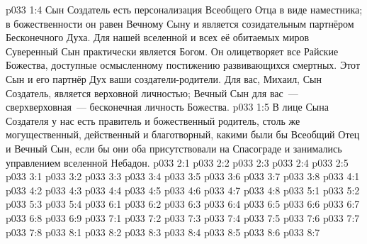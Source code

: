 \vs p033 1:4 Сын Создатель есть персонализация Всеобщего Отца в виде наместника; в божественности он равен Вечному Сыну и является созидательным партнёром Бесконечного Духа. Для нашей вселенной и всех её обитаемых миров Суверенный Сын практически является Богом. Он олицетворяет все Райские Божества, доступные осмысленному постижению развивающихся смертных. Этот Сын и его партнёр Дух  ваши создатели\hyp{}родители. Для вас, Михаил, Сын Создатель, является верховной личностью; Вечный Сын для вас~--- сверхверховная~--- бесконечная личность Божества.
\vs p033 1:5 \pc В лице Сына Создателя у нас есть правитель и божественный родитель, столь же могущественный, действенный и благотворный, какими были бы Всеобщий Отец и Вечный Сын, если бы они оба присутствовали на Спасограде и занимались управлением вселенной Небадон.
\vs p033 2:1 
\vs p033 2:2 
\vs p033 2:3 \pc 
\vs p033 2:4 
\vs p033 2:5 \pc 
{}
\vs p033 3:1 
\vs p033 3:2 \pc 
\vs p033 3:3 \pc 
\vs p033 3:4 \pc 
\vs p033 3:5 
\vs p033 3:6 
\vs p033 3:7 
\vs p033 3:8 \pc 
{}
\vs p033 4:1 
\vs p033 4:2 
\vs p033 4:3 
\vs p033 4:4 \pc 
\vs p033 4:5 
\vs p033 4:6 
\vs p033 4:7 \pc 
\vs p033 4:8 
\vs p033 5:1 
\vs p033 5:2 
\vs p033 5:3 
\vs p033 5:4 
\vs p033 6:1 
\vs p033 6:2 
\vs p033 6:3 \pc 
\vs p033 6:4 \pc 
\vs p033 6:5 \pc 
\vs p033 6:6 
\vs p033 6:7 \pc 
\vs p033 6:8 
\vs p033 6:9 
\vs p033 7:1 
\vs p033 7:2 
\vs p033 7:3 
\vs p033 7:4 
\vs p033 7:5 
\vs p033 7:6 
\vs p033 7:7 \pc 
\vs p033 7:8 
\vs p033 8:1 
\vs p033 8:2 
\vs p033 8:3 \pc 
\vs p033 8:4 \pc 
\vs p033 8:5 \pc 
\vs p033 8:6 
\vsetoff
\vs p033 8:7 
\quizlink
